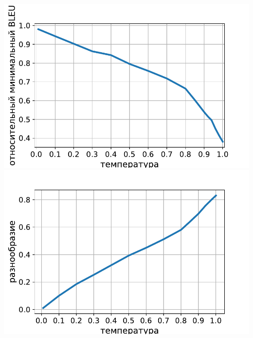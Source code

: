 \documentclass[unicode]{beamer}
\begin{document}
\begin{frame}
    \begin{center}
        \includegraphics[scale=0.25]{min-bleu-temperature-sampling.pdf}
        \includegraphics[scale=0.25]{diversity-temperature-sampling.pdf}
    \end{center}
\end{frame}
\end{document}
